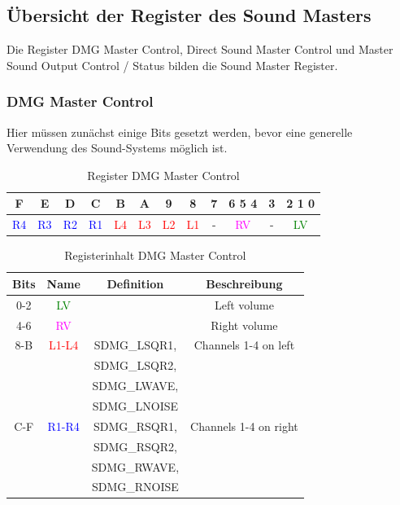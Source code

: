 \documentclass[11pt,a4paper]{scrartcl}
\begin{document}

\subsection{\"Ubersicht der Register des Sound Masters}

Die Register DMG Master Control, Direct Sound Master Control und Master Sound Output Control / Status bilden die Sound Master Register.\\


\subsubsection{DMG Master Control} \label{dmgmastercontrol}

	Hier m\"ussen zun\"achst einige Bits gesetzt werden, bevor eine generelle Verwendung des Sound-Systems m\"oglich ist.\\

	\begin{table}[h]
	\centering
	\begin{tabular}{| c | c | c | c | c | c | c | c | c | c | c | c |}
	\hline
	F & E & D & C & B & A & 9 & 8 & 7 & 6 5 4 & 3 & 2 1 0 \\
	\hline
	\textcolor{blue}{R4} & \textcolor{blue}{R3} & \textcolor{blue}{R2} & \textcolor{blue}{R1} & \textcolor{red}{L4} & \textcolor{red}{L3}
	& \textcolor{red}{L2} & \textcolor{red}{L1} & - & \textcolor{magenta}{RV} & - & \textcolor{green}{LV} \\
	\hline
	
	\end{tabular}
	\caption{Register DMG Master Control}
	\label{table: DMGMasterControl}
	\end{table}
	
	\begin{table}[h]
	\centering
	\begin{tabular}{| c | c | c | c |}
	\hline
	\textbf{Bits} & \textbf{Name} & \textbf{Definition} & \textbf{Beschreibung} \\
	\hline
	0-2 & \textcolor{green}{LV} & & Left volume \\
	\hline
	4-6 & \textcolor{magenta}{RV} & & Right volume \\
	\hline
	8-B & \textcolor{red}{L1-L4} & SDMG\_LSQR1,  & Channels 1-4 on left \\
	& & SDMG\_LSQR2, & \\
	& & SDMG\_LWAVE, & \\
	& & SDMG\_LNOISE & \\
  \hline
	C-F & \textcolor{blue}{R1-R4} & SDMG\_RSQR1, & Channels 1-4 on right \\
	& & SDMG\_RSQR2, & \\
	& & SDMG\_RWAVE, & \\
	& & SDMG\_RNOISE & \\
	\hline
	
	\end{tabular}
	\caption{Registerinhalt DMG Master Control}
	\label{table: DMGMasterControlContent}
	\end{table}
\end{document}
